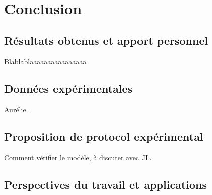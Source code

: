 \chapter{Conclusion}

\section{Résultats obtenus et apport personnel}
Blablablaaaaaaaaaaaaaaaa

\section{Données expérimentales}
Aurélie...

\section{Proposition de protocol expérimental}
Comment vérifier le modèle, à discuter avec JL.

\section{Perspectives du travail et applications}